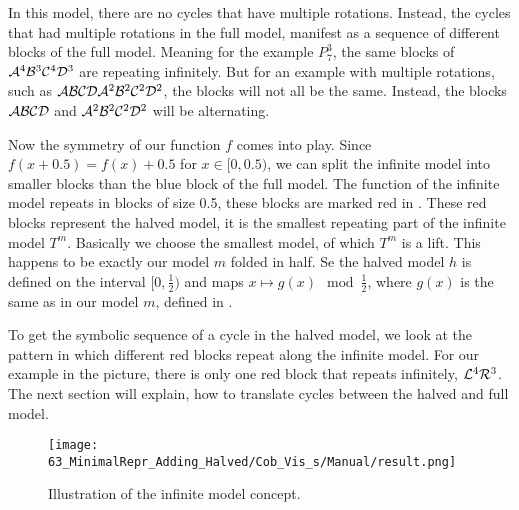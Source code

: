 
In this model, there are no cycles that have multiple rotations.
Instead, the cycles that had multiple rotations in the full model, manifest as a sequence of different blocks of the full model.
Meaning for the example $P_7^3$, the same blocks of $\mathcal{A}^4\mathcal{B}^3\mathcal{C}^4\mathcal{D}^3$ are repeating infinitely.
But for an example with multiple rotations, such as $\mathcal{A}\mathcal{B}\mathcal{C}\mathcal{D}\mathcal{A}^2\mathcal{B}^2\mathcal{C}^2\mathcal{D}^2$, the blocks will not all be the same.
Instead, the blocks $\mathcal{A}\mathcal{B}\mathcal{C}\mathcal{D}$ and $\mathcal{A}^2\mathcal{B}^2\mathcal{C}^2\mathcal{D}^2$ will be alternating.

Now the symmetry of our function $f$ comes into play.
Since $f(x + 0.5) = f(x) + 0.5$ for $x \in [0, 0.5)$, we can split the infinite model into smaller blocks than the blue block of the full model.
The function of the infinite model repeats in blocks of size 0.5, these blocks are marked red in .
These red blocks represent the halved model, it is the smallest repeating part of the infinite model $T^m$.
Basically we choose the smallest model, of which $T^m$ is a lift.
This happens to be exactly our model $m$ folded in half.
Se the halved model $h$ is defined on the interval $[0, \frac{1}{2})$ and maps $x \mapsto g(x) \mod \frac{1}{2}$, where $g(x)$ is the same as in our model $m$, defined in .

To get the symbolic sequence of a cycle in the halved model, we look at the pattern in which different red blocks repeat along the infinite model.
For our example in the picture, there is only one red block that repeats infinitely, $\mathcal{L}^4\mathcal{R}^3$.
The next section will explain, how to translate cycles between the halved and full model.

\begin{figure}
	\centering
	\texttt{[image: 63\_MinimalRepr\_Adding\_Halved/Cob\_Vis\_s/Manual/result.png]}
	\caption{Illustration of the infinite model concept.}
	\label{fig:minrep.infinite.model.concept}
\end{figure}




